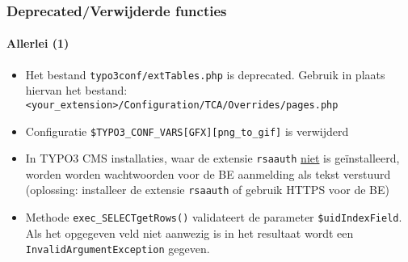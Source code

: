 \begin{frame}[fragile]
	\frametitle{Deprecated/Verwijderde functies}
	\framesubtitle{Allerlei (1)}

	\begin{itemize}

		\item Het bestand \texttt{typo3conf/extTables.php} is deprecated.\newline
			Gebruik in plaats hiervan het bestand:\newline
			\smaller\texttt{<your\_extension>/Configuration/TCA/Overrides/pages.php}\normalsize

		\item Configuratie \texttt{\$TYPO3\_CONF\_VARS[GFX][png\_to\_gif]} is verwijderd

		\item In TYPO3 CMS installaties, waar de extensie
			\texttt{rsaauth} \underline{niet} is geïnstalleerd, worden worden wachtwoorden voor de BE aanmelding
			als tekst verstuurd\newline
			\small(oplossing: installeer de extensie \texttt{rsaauth} of gebruik HTTPS voor de BE)\normalsize

		\item Methode \texttt{exec\_SELECTgetRows()} validateert de parameter \texttt{\$uidIndexField}.
			Als het opgegeven veld niet aanwezig is in het resultaat wordt een
			\texttt{InvalidArgumentException} gegeven.

	\end{itemize}

\end{frame}


